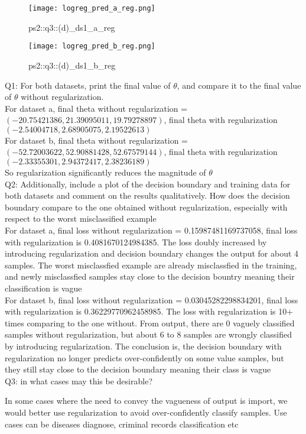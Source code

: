 \begin{answer}

\begin{figure}[H]
    \centering
    \texttt{[image: logreg\_pred\_a\_reg.png]}
    \caption{ps2::q3::(d)\_ds1\_a\_reg}
    \label{fig:enter-label}
\end{figure}

\begin{figure}[H]
    \centering
    \texttt{[image: logreg\_pred\_b\_reg.png]}
    \caption{ps2::q3::(d)\_ds1\_b\_reg}
    \label{fig:enter-label}
\end{figure}


Q1: For both datasets, print the final value of $\theta$, and compare it to the final value of $\theta$ without regularization. \\
For dataset a, final theta without regularization = $\left(-20.75421386, 21.39095011, 19.79278897 \right)$, final theta with regularization $\left( -2.54004718, 2.68905075, 2.19522613 \right)$\\

For dataset b, final theta without regularization = $\left(-52.72003622  , 52.90881428, 52.67579144 \right)$, final theta with regularization $\left( -2.33355301, 2.94372417, 2.38236189 \right)$\\

So regularization significantly reduces the magnitude of $\theta$ \\ 


Q2: Additionally, include a plot of the decision boundary and training data for both datasets and comment on the results qualitatively. How does the decision boundary compare to the one obtained without regularization, especially with respect to the worst misclassified example \\ 

For dataset a, final loss without regularization = 0.15987481169737058, final loss with regularization is 0.4081670124984385. The loss doubly increased by introducing regularization and decision boundary changes the output for about 4 samples. The worst misclassfied example are already misclassfied in the training, and newly misclassfied samples stay close to the decision bountry meaning their classification is vague\\

For dataset b, final loss without regularization = 0.03045282298834201, final loss with regularization is 0.36229770962458985. The loss with regularization is 10+ times comparing to the one without. From output, there are 0 vaguely classified samples without regularization, but about 6 to 8 samples are wrongly classified by introducing regularization. The conclusion is, the decision boundary with regularization no longer predicts over-confidently on some value samples, but they still stay close to the decision boundary meaning their class is vague\\ 

Q3: in what cases may this be desirable?

In some cases where the need to convey the vagueness of output is import, we would better use regularization to avoid over-confidently classify samples. Use cases can be diseases diagnose, criminal records classification etc 



\end{answer}
